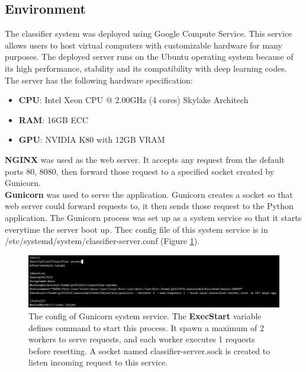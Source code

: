 \subsection{Environment}
The classifier system was deployed using Google Compute Service. This service allows users to host virtual computers with customizable hardware for many purposes. The deployed server runs on the Ubuntu operating system because of its high performance, stability and its compatibility with deep learning codes. The server has the following hardware specification:

\begin{itemize}
	\item \textbf{CPU}: Intel Xeon CPU @ 2.00GHz (4 cores) Skylake Architech
	\item \textbf{RAM}: 16GB ECC 
	\item \textbf{GPU}: NVIDIA K80 with 12GB VRAM
\end{itemize}
\textbf{NGINX} was used as the web server. It accepts any request from the default ports 80, 8080, then forward those request to a specified socket created by Gunicorn.\\
\textbf{Gunicorn} was used to serve the application. Gunicorn creates a socket so that web server could forward requests to, it then sends those request to the Python application. The Gunicorn process was set up as a system service so that it starts everytime the server boot up. Thec config file of this system service is in /etc/systemd/system/classifier-server.conf (Figure \ref{chap4:server_config}).
\begin{center}
    \begin{figure}[H]
    \centering
    \includegraphics[width=1\columnwidth]{images/chap4/server_config.png}
	\caption{The config of Gunicorn system service. The \textbf{ExecStart} variable defines command to start this process. It spawn a maximum of 2 workers to serve requests, and each worker executes 1 requests before resetting. A socket named classifier-server.sock  is created to listen incoming request to this service.}   
	\label{chap4:server_config}
    \end{figure}
\end{center}

